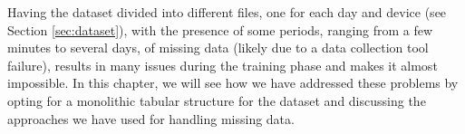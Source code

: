 Having the dataset divided into different files, one for each day
and device (see Section \ref{sec:dataset}), with the presence of
some periods, ranging from a few minutes to several days,
of missing data (likely due to a data collection tool failure),
results in many issues during the training phase and makes it
almost impossible. In this chapter, we will see how we have
addressed these problems by opting for a monolithic tabular
structure for the dataset and discussing the approaches we have
used for handling missing data.

